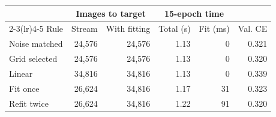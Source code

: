 \begin{tabular}{@{}lrrrrr@{}}
\toprule
 & \multicolumn{2}{c}{Images to target} & \multicolumn{2}{c}{15-epoch time} & \\
\cmidrule(lr){2-3}\cmidrule(lr){4-5}
Rule & Stream & With fitting & Total (s) & Fit (ms) & Val. CE \\
\midrule
Noise matched & 24,576 & 24,576 & 1.13 & 0 & 0.321 \\
Grid selected & 24,576 & 24,576 & 1.13 & 0 & 0.320 \\
Linear & 34,816 & 34,816 & 1.13 & 0 & 0.339 \\
Fit once & 26,624 & 34,816 & 1.17 & 31 & 0.323 \\
Refit twice & 26,624 & 34,816 & 1.22 & 91 & 0.320 \\
\bottomrule
\end{tabular}
